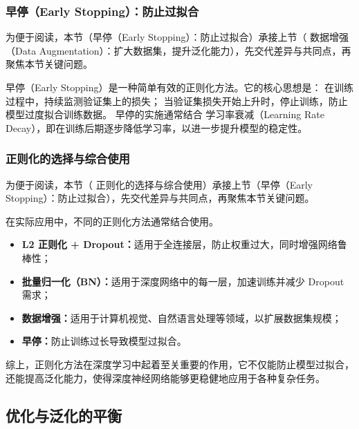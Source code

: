 
\subsubsection*{早停（Early Stopping）：防止过拟合}


为便于阅读，本节（早停（Early Stopping）：防止过拟合）承接上节（ 数据增强（Data Augmentation）：扩大数据集，提升泛化能力），先交代差异与共同点，再聚焦本节关键问题。

早停（Early Stopping）是一种简单有效的正则化方法。它的核心思想是： 在训练过程中，持续监测验证集上的损失； 当验证集损失开始上升时，停止训练，防止模型过度拟合训练数据。
早停的实施通常结合 学习率衰减（Learning Rate Decay），即在训练后期逐步降低学习率，以进一步提升模型的稳定性。
\subsubsection*{ 正则化的选择与综合使用}


为便于阅读，本节（ 正则化的选择与综合使用）承接上节（早停（Early Stopping）：防止过拟合），先交代差异与共同点，再聚焦本节关键问题。

在实际应用中，不同的正则化方法通常结合使用。
\begin{itemize}
\item {\bf   L2 正则化 + Dropout：}适用于全连接层，防止权重过大，同时增强网络鲁棒性；
\item {\bf   批量归一化（BN）：}适用于深度网络中的每一层，加速训练并减少 Dropout 需求；
\item {\bf  数据增强：}适用于计算机视觉、自然语言处理等领域，以扩展数据集规模；
\item {\bf  早停：}防止训练过长导致模型过拟合。
\end{itemize}
综上，正则化方法在深度学习中起着至关重要的作用，它不仅能防止模型过拟合，还能提高泛化能力，使得深度神经网络能够更稳健地应用于各种复杂任务。


 \subsection{优化与泛化的平衡}

